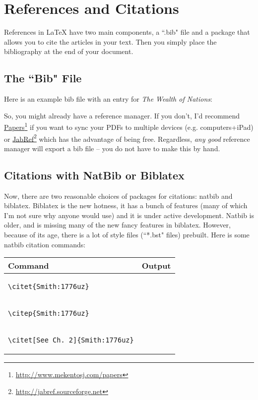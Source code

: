 \section{References and Citations}

References in LaTeX have two main components, a ``.bib" file and a package that allows you to cite the articles in your text.  Then you simply place the bibliography at the end of your document.  

\subsection{The ``Bib" File}

Here is an example bib file with an entry for \emph{The Wealth of Nations}: 

\begin{quote}
	
\end{quote}

So, you might already have a reference manager.  If you don't, I'd recommend \href{http://www.mekentosj.com/papers/}{Papers}\footnote{\href{http://www.mekentosj.com/papers/}{http:/\slash www.mekentosj.com\slash papers}} if you want to sync your PDFs to multiple devices (e.g. computers+iPad) or \href{http://jabref.sourceforge.net}{JabRef}\footnote{\href{http://jabref.sourceforge.net}{http:/\slash jabref.sourceforge.net}} which has the advantage of being free.  Regardless, \emph{any good} reference manager will export a bib file -- you do not have to make this by hand.  

\subsection{Citations with NatBib or Biblatex}

Now, there are two reasonable choices of packages for citations: natbib and biblatex. Biblatex is the new hotness, it has a bunch of features (many of which I'm not sure why anyone would use) and it is under active development. Natbib is older, and is missing many of the new fancy features in biblatex.  However, because of its age, there is a lot of style files (``*.bst" files) prebuilt.  Here is some natbib citation commands:

\begin{table}[h]
\centering
	\begin{tabular}{m{8cm}l}
		Command       & Output \tabularnewline \hline
 		 \begin{verbatim}\citet{Smith:1776uz}\end{verbatim}
 		& \citet{Smith:1776uz}      \tabularnewline 
 		\begin{verbatim}\citep{Smith:1776uz}\end{verbatim}
 		& \citep{Smith:1776uz}			\tabularnewline
 		\begin{verbatim}\citet[See Ch. 2]{Smith:1776uz}\end{verbatim}
 		& \citet[See Ch. 2]{Smith:1776uz}     \tabularnewline
 	\end{tabular}
\end{table}

